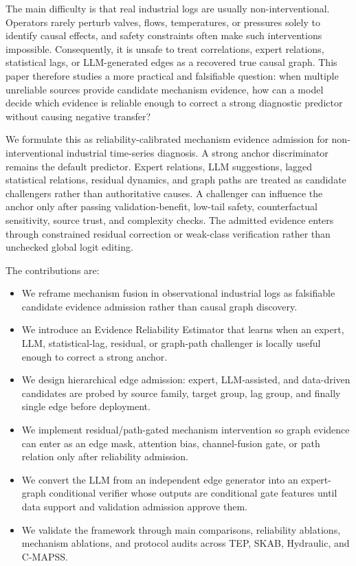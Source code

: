 \documentclass[letterpaper]{article}
\begin{document}
The main difficulty is that real industrial logs are usually non-interventional. Operators rarely perturb valves, flows, temperatures, or pressures solely to identify causal effects, and safety constraints often make such interventions impossible. Consequently, it is unsafe to treat correlations, expert relations, statistical lags, or LLM-generated edges as a recovered true causal graph. This paper therefore studies a more practical and falsifiable question: when multiple unreliable sources provide candidate mechanism evidence, how can a model decide which evidence is reliable enough to correct a strong diagnostic predictor without causing negative transfer?

We formulate this as reliability-calibrated mechanism evidence admission for non-interventional industrial time-series diagnosis. A strong anchor discriminator remains the default predictor. Expert relations, LLM suggestions, lagged statistical relations, residual dynamics, and graph paths are treated as candidate challengers rather than authoritative causes. A challenger can influence the anchor only after passing validation-benefit, low-tail safety, counterfactual sensitivity, source trust, and complexity checks. The admitted evidence enters through constrained residual correction or weak-class verification rather than unchecked global logit editing.

The contributions are:
\begin{itemize}
  \item We reframe mechanism fusion in observational industrial logs as falsifiable candidate evidence admission rather than causal graph discovery.
  \item We introduce an Evidence Reliability Estimator that learns when an expert, LLM, statistical-lag, residual, or graph-path challenger is locally useful enough to correct a strong anchor.
  \item We design hierarchical edge admission: expert, LLM-assisted, and data-driven candidates are probed by source family, target group, lag group, and finally single edge before deployment.
  \item We implement residual/path-gated mechanism intervention so graph evidence can enter as an edge mask, attention bias, channel-fusion gate, or path relation only after reliability admission.
  \item We convert the LLM from an independent edge generator into an expert-graph conditional verifier whose outputs are conditional gate features until data support and validation admission approve them.
  \item We validate the framework through main comparisons, reliability ablations, mechanism ablations, and protocol audits across TEP, SKAB, Hydraulic, and C-MAPSS.
\end{itemize}
\end{document}
